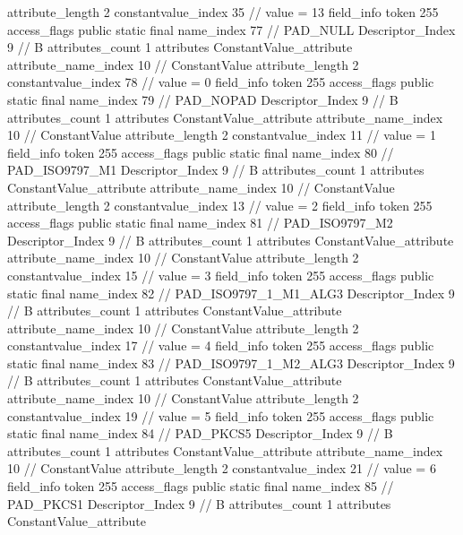{{{{{{{					attribute_length	2
					constantvalue_index	35		// value = 13
				}
				}
			}
			field_info {
				token	255
				access_flags	public static final
				name_index	77		// PAD_NULL
				Descriptor_Index	9		// B
				attributes_count	1
				attributes {
				ConstantValue_attribute {
					attribute_name_index	10		// ConstantValue
					attribute_length	2
					constantvalue_index	78		// value = 0
				}
				}
			}
			field_info {
				token	255
				access_flags	public static final
				name_index	79		// PAD_NOPAD
				Descriptor_Index	9		// B
				attributes_count	1
				attributes {
				ConstantValue_attribute {
					attribute_name_index	10		// ConstantValue
					attribute_length	2
					constantvalue_index	11		// value = 1
				}
				}
			}
			field_info {
				token	255
				access_flags	public static final
				name_index	80		// PAD_ISO9797_M1
				Descriptor_Index	9		// B
				attributes_count	1
				attributes {
				ConstantValue_attribute {
					attribute_name_index	10		// ConstantValue
					attribute_length	2
					constantvalue_index	13		// value = 2
				}
				}
			}
			field_info {
				token	255
				access_flags	public static final
				name_index	81		// PAD_ISO9797_M2
				Descriptor_Index	9		// B
				attributes_count	1
				attributes {
				ConstantValue_attribute {
					attribute_name_index	10		// ConstantValue
					attribute_length	2
					constantvalue_index	15		// value = 3
				}
				}
			}
			field_info {
				token	255
				access_flags	public static final
				name_index	82		// PAD_ISO9797_1_M1_ALG3
				Descriptor_Index	9		// B
				attributes_count	1
				attributes {
				ConstantValue_attribute {
					attribute_name_index	10		// ConstantValue
					attribute_length	2
					constantvalue_index	17		// value = 4
				}
				}
			}
			field_info {
				token	255
				access_flags	public static final
				name_index	83		// PAD_ISO9797_1_M2_ALG3
				Descriptor_Index	9		// B
				attributes_count	1
				attributes {
				ConstantValue_attribute {
					attribute_name_index	10		// ConstantValue
					attribute_length	2
					constantvalue_index	19		// value = 5
				}
				}
			}
			field_info {
				token	255
				access_flags	public static final
				name_index	84		// PAD_PKCS5
				Descriptor_Index	9		// B
				attributes_count	1
				attributes {
				ConstantValue_attribute {
					attribute_name_index	10		// ConstantValue
					attribute_length	2
					constantvalue_index	21		// value = 6
				}
				}
			}
			field_info {
				token	255
				access_flags	public static final
				name_index	85		// PAD_PKCS1
				Descriptor_Index	9		// B
				attributes_count	1
				attributes {
				ConstantValue_attribute {
}}}}}}}
